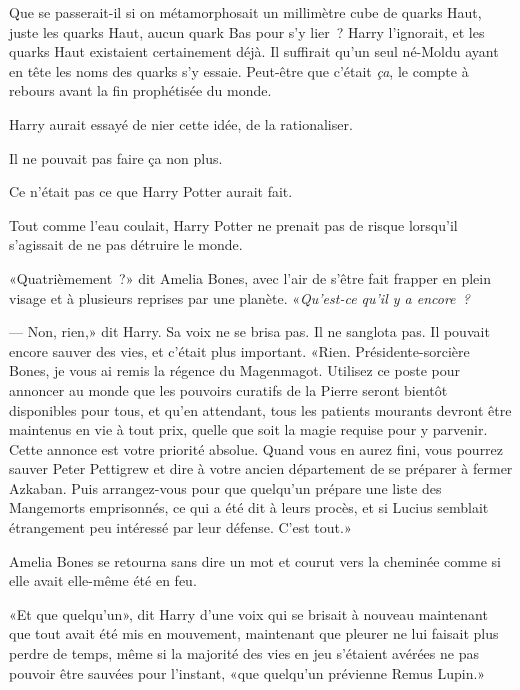 Que se passerait-il si on métamorphosait un millimètre cube de quarks Haut, juste les quarks Haut, aucun quark Bas pour s'y lier~? Harry l'ignorait, et les quarks Haut existaient certainement déjà. Il suffirait qu'un seul né-Moldu ayant en tête les noms des quarks s'y essaie. Peut-être que c'était \emph{ça}, le compte à rebours avant la fin prophétisée du monde.

Harry aurait essayé de nier cette idée, de la rationaliser.

Il ne pouvait pas faire ça non plus.

Ce n'était pas ce que Harry Potter aurait fait.

Tout comme l'eau coulait, Harry Potter ne prenait pas de risque lorsqu'il s'agissait de ne pas détruire le monde.

«Quatrièmement~?» dit Amelia Bones, avec l'air de s'être fait frapper en plein visage et à plusieurs reprises par une planète. «\emph{Qu'est-ce qu'il y a encore~?}

--- Non, rien,» dit Harry. Sa voix ne se brisa pas. Il ne sanglota pas. Il pouvait encore sauver des vies, et c'était plus important. «Rien. Présidente-sorcière Bones, je vous ai remis la régence du Magenmagot. Utilisez ce poste pour annoncer au monde que les pouvoirs curatifs de la Pierre seront bientôt disponibles pour tous, et qu'en attendant, tous les patients mourants devront être maintenus en vie à tout prix, quelle que soit la magie requise pour y parvenir. Cette annonce est votre priorité absolue. Quand vous en aurez fini, vous pourrez sauver Peter Pettigrew et dire à votre ancien département de se préparer à fermer Azkaban. Puis arrangez-vous pour que quelqu'un prépare une liste des Mangemorts emprisonnés, ce qui a été dit à leurs procès, et si Lucius semblait étrangement peu intéressé par leur défense. C'est tout.»

Amelia Bones se retourna sans dire un mot et courut vers la cheminée comme si elle avait elle-même été en feu.

«Et que quelqu'un», dit Harry d'une voix qui se brisait à nouveau maintenant que tout avait été mis en mouvement, maintenant que pleurer ne lui faisait plus perdre de temps, même si la majorité des vies en jeu s'étaient avérées ne pas pouvoir être sauvées pour l'instant, «que quelqu'un prévienne Remus Lupin.»
